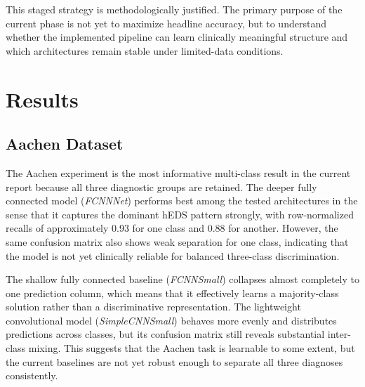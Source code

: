 \documentclass[12pt]{report}
\begin{document}
This staged strategy is methodologically justified. The primary purpose of the current phase is not yet to maximize headline accuracy, but to understand whether the implemented pipeline can learn clinically meaningful structure and which architectures remain stable under limited-data conditions.

\chapter{Results}

\section{Aachen Dataset}

The Aachen experiment is the most informative multi-class result in the current report because all three diagnostic groups are retained. The deeper fully connected model (\textit{FCNNNet}) performs best among the tested architectures in the sense that it captures the dominant hEDS pattern strongly, with row-normalized recalls of approximately 0.93 for one class and 0.88 for another. However, the same confusion matrix also shows weak separation for one class, indicating that the model is not yet clinically reliable for balanced three-class discrimination.

The shallow fully connected baseline (\textit{FCNNSmall}) collapses almost completely to one prediction column, which means that it effectively learns a majority-class solution rather than a discriminative representation. The lightweight convolutional model (\textit{SimpleCNNSmall}) behaves more evenly and distributes predictions across classes, but its confusion matrix still reveals substantial inter-class mixing. This suggests that the Aachen task is learnable to some extent, but the current baselines are not yet robust enough to separate all three diagnoses consistently.
\end{document}
